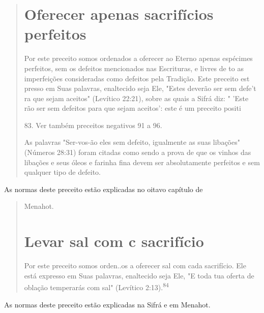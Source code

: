 \begin{quote}
\section{Oferecer apenas sacrifícios perfeitos}

Por este preceito somos ordenados a oferecer ao Eterno apenas espé­cimes
perfeitos, sem os defeitos mencionados nas Escrituras, e livres de to as
imperfeições consideradas como defeitos pela Tradição. Este preceito est
presso em Suas palavras, enaltecido seja Ele, "Estes deverão ser sem
defe't ra que sejam aceitos" (Levítico 22:21), sobre as quais a Sifrá
diz: " 'Este rão ser sem defeitos para que sejam aceitos': este é um
preceito positi

83. Ver também preceitos negativos 91 a 96.



As palavras "Ser-vos-ão eles sem defeito, igualmente as suas libações"
(Números 28:31) foram citadas como sendo a prova de que os vinhos das
liba­ções e seus óleos e farinha fina devem ser absolutamente perfeitos
e sem qual­quer tipo de defeito.
\end{quote}

As normas deste preceito estão explicadas no oitavo capítulo de

\begin{quote}
Menahot.

\section{Levar sal com c sacrifício}

Por este preceito somos orden..os a oferecer sal com cada sacrifí­cio.
Ele está expresso em Suas palavras, enaltecido seja Ele, "E toda tua
oferta de oblação temperarás com sal" (Levítico
2:13).\textsuperscript{84}
\end{quote}

As normas deste preceito estão explicadas na Sifrá e em Menahot.

